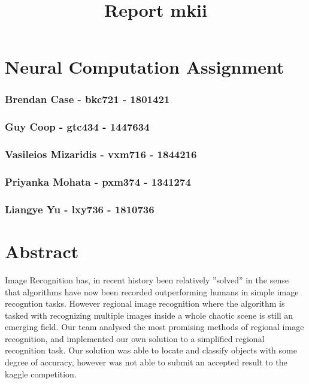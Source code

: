 \documentclass[11pt]{article}
\title{Report mkii}
\begin{document}
   
    
    \section*{Neural Computation
Assignment}\label{neural-computation-assignment}

\subsubsection*{Brendan Case - bkc721 -
1801421}\label{brendan-case---bkc721---1801421}

\subsubsection*{Guy Coop - gtc434 -
1447634}\label{guy-coop---gtc434---1447634}

\subsubsection*{Vasileios Mizaridis - vxm716 -
1844216}\label{vasileios-mizaridis---vxm716---1844216}

\subsubsection*{Priyanka Mohata - pxm374 -
1341274}\label{priyanka-mohata---pxm374---1341274}

\subsubsection*{Liangye Yu - lxy736 -
1810736}\label{liangye-yu---lxy736---1810736}

    \section*{Abstract}\label{abstract}

Image Recognition has, in recent history been relatively ''solved'' in
the sense that algorithms have now been recorded outperforming humans in
simple image recogntion tasks. However regional image recognition where
the algorithm is tasked with recognizing multiple images inside a whole
chaotic scene is still an emerging field. Our team analysed the most
promising methods of regional image recognition, and implemented our own
solution to a simplified regional recognition task. Our solution was
able to locate and classify objects with some degree of accuracy,
however was not able to submit an accepted result to the kaggle
competition.
\end{document}
